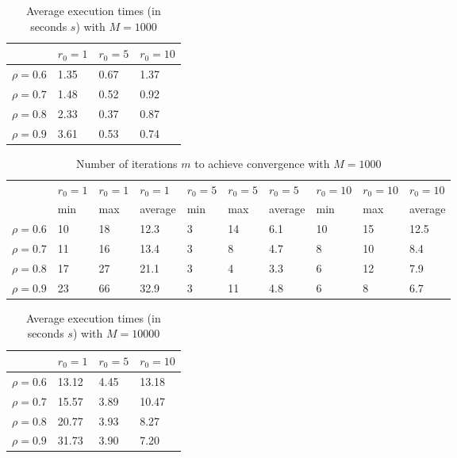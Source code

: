 \documentclass[a4paper,11pt,openright]{report}
\begin{document}
\begin{table}[H]
\centering
\addtolength{\leftskip}{-1.5cm}
\addtolength{\rightskip}{-1.5cm}
\begin{tabular}{|c|lll|}
\hline
$ $ & $r_0 = 1$ & $r_0 = 5$ & $r_0 = 10$ \\
\hline
$\rho = 0.6$ & 1.35 & 0.67 & 1.37 \\

$\rho = 0.7$ & 1.48 & 0.52 & 0.92 \\

$\rho = 0.8$ & 2.33 & 0.37 & 0.87 \\

$\rho = 0.9$ & 3.61 & 0.53 & 0.74 \\
\hline
\end{tabular}
\caption{Average execution
 times (in seconds $s$) with $M = 1000$}
\end{table}
\begin{table}[H]
\centering
\addtolength{\leftskip}{-1.5cm}
\addtolength{\rightskip}{-1.5cm}
\begin{tabular}{|c|lllllllll|}
\hline
$ $ & $r_0 = 1$ & $r_0 = 1$ & $r_0 = 1$ & $r_0 = 5$ & $r_0 = 5$ & $r_0 = 5$ & $r_0 = 10$ & $r_0 = 10$ & $r_0 = 10$  \\
$ $ & min & max & average & min & max & average & min & max & average \\ 
\hline
$\rho = 0.6$ & 10 & 18 & 12.3 & 3 & 14 & 6.1 & 10 & 15 & 12.5 \\

$\rho = 0.7$ & 11 & 16 & 13.4 & 3 & 8 & 4.7 & 8 & 10 & 8.4 \\

$\rho = 0.8$ & 17 & 27 & 21.1 & 3 & 4 & 3.3 & 6 & 12 & 7.9 \\

$\rho = 0.9$ & 23 & 66 & 32.9 & 3 & 11 & 4.8 & 6 & 8 & 6.7\\
\hline
\end{tabular}
\caption{Number of iterations $m$ to achieve convergence with $M = 1000$}
\end{table}
\begin{table}[H]
\centering
\addtolength{\leftskip}{-1.5cm}
\addtolength{\rightskip}{-1.5cm}
\begin{tabular}{|c|lll|}
\hline
$ $ & $r_0 = 1$ & $r_0 = 5$ & $r_0 = 10$ \\
\hline
$\rho = 0.6$ & 13.12 & 4.45 & 13.18 \\

$\rho = 0.7$ & 15.57 & 3.89 & 10.47 \\

$\rho = 0.8$ & 20.77 & 3.93 & 8.27 \\

$\rho = 0.9$ & 31.73 & 3.90 & 7.20 \\
\hline
\end{tabular}
\caption{Average execution
 times (in seconds $s$) with $M = 10000$}
\end{table}
\end{document}
